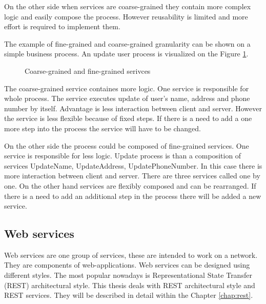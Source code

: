 On the other side when services are coarse-grained they contain more complex logic and easily compose the process. However reusability is limited and more effort is required to implement them.

The example of fine-grained and coarse-grained granularity can be shown on a simple business process. An update user process is visualized on the Figure \ref{fig:granularity}.

\begin{figure}[htp] 
\caption{Coarse-grained and fine-grained serivces}
\label{fig:granularity}
\end{figure}

The coarse-grained service containes more logic. One service is responsible for whole process. The service executes update of user's name, address and phone number by itself. Advantage is less interaction between client and server. However the service is less flexible because of fixed steps. If there is a need to add a one more step into the process the service will have to be changed.

On the other side the process could be composed of fine-grained services. One service is responsible for less logic. Update process is than a composition of services UpdateName, UpdateAddress, UpdatePhoneNumber. In this case there is more interaction between client and server. There are three services called one by one. On the other hand services are flexibly composed and can be rearranged. If there is a need to add an additional step in the process there will be added a new service.


\subsection{Web services}
Web services are one group of services, these are intended to work on a network. They are components of \gls{web-applications}. Web services can be designed using different styles. The most popular nowadays is Representational State Transfer (REST) architectural style. This thesis deals with REST architectural style and REST services. They will be described in detail within the Chapter \ref{chap:rest}.


